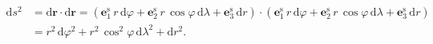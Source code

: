 \documentclass[a4paper, 12pt]{book}
\newcommand{\diff}{\mathrm d}
\let\vec\mathbf
\begin{document}
%
\begin{equation}
\begin{split}
\diff s^2 &= \diff \vec r \cdot \diff \vec r = \left( \vec e_1^\mathrm{s} \, 
r \, \diff \varphi + \vec e_2^\mathrm{s} \, r \, \cos\varphi \, \diff \lambda 
+ \vec e_3^\mathrm{s} \, \diff r \right) \cdot \left( \vec e_1^\mathrm{s} \, 
r \, \diff \varphi + \vec e_2^\mathrm{s} \, r \, \cos\varphi \, \diff \lambda 
+ \vec e_3^\mathrm{s} \, \diff r \right)\\
%
&=  r^2 \, \diff\varphi^2 + r^2 \, \cos^2\varphi \, \diff\lambda^2 + \diff 
r^2{.}
\end{split}
\end{equation}







\printbibliography[title=Literat\'{u}ra]

\end{document}
